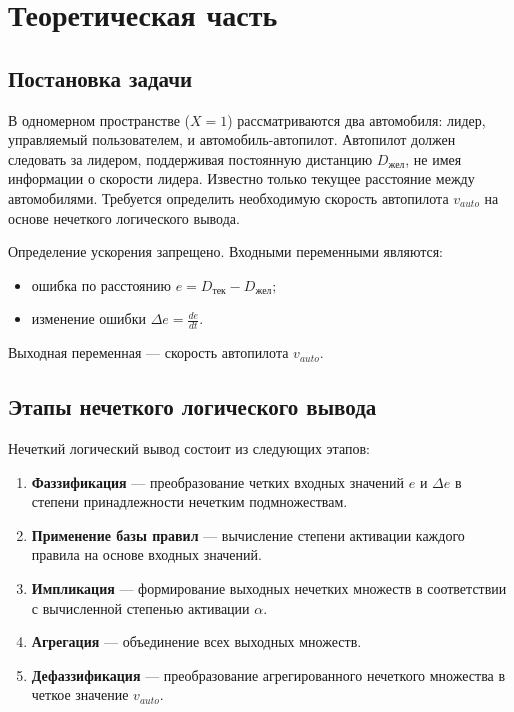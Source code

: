\chapter{Теоретическая часть}

\section{Постановка задачи}

В одномерном пространстве (\( X=1 \)) рассматриваются два автомобиля: лидер, управляемый пользователем, и автомобиль-автопилот.  
Автопилот должен следовать за лидером, поддерживая постоянную дистанцию \( D_{жел} \), не имея информации о скорости лидера.  
Известно только текущее расстояние между автомобилями.  
Требуется определить необходимую скорость автопилота \( v_{auto} \) на основе нечеткого логического вывода.

Определение ускорения запрещено.  
Входными переменными являются:
\begin{itemize}
    \item ошибка по расстоянию \( e = D_{тек} - D_{жел} \);
    \item изменение ошибки \( \Delta e = \frac{de}{dt} \).
\end{itemize}

Выходная переменная — скорость автопилота \( v_{auto} \).

\section{Этапы нечеткого логического вывода}

Нечеткий логический вывод состоит из следующих этапов:

\begin{enumerate}
    \item \textbf{Фаззификация} — преобразование четких входных значений \( e \) и \( \Delta e \) в степени принадлежности нечетким подмножествам.
    \item \textbf{Применение базы правил} — вычисление степени активации каждого правила на основе входных значений.
    \item \textbf{Импликация} — формирование выходных нечетких множеств в соответствии с вычисленной степенью активации \(\alpha\).
    \item \textbf{Агрегация} — объединение всех выходных множеств.
    \item \textbf{Дефаззификация} — преобразование агрегированного нечеткого множества в четкое значение \( v_{auto} \).
\end{enumerate}

